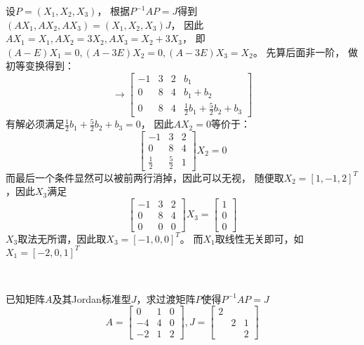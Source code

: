 \begin{solution}
  设$P = (X_1,X_2,X_3)$，
  根据$P^{-1}AP = J$得到$(AX_1,AX_2,AX_3) = (X_1,X_2,X_3)J$，
  因此$AX_1 = X_1, AX_2 = 3X_2, AX_3 = X_2 + 3X_3$，
  即$(A - E)X_1 = 0, (A - 3E)X_2 = 0, (A - 3E)X_3 = X_2$。
  先算后面非一阶，
  做初等变换得到：
  \begin{equation*}
    [A - 3E | b] \rightarrow
    \left[
      \begin{array}{cccc}
        -1&3&2&b_1 \\
          0&8&4&b_1 + b_2 \\
          0&8&4&\frac{1}{2}b_1 + \frac{5}{2}b_2 + b_3
      \end{array}
    \right]
  \end{equation*}
  有解必须满足$\frac{1}{2}b_1 + \frac{5}{2}b_2 + b_3 = 0$，
  因此$AX_2 = 0$等价于：
  \begin{equation*}
    \left[
      \begin{array}{ccc}
        -1&3&2 \\
          0&8&4 \\
          \frac{1}{2}&\frac{5}{2}&1
      \end{array}
    \right]X_2 = 0  
  \end{equation*}
  而最后一个条件显然可以被前两行消掉，因此可以无视，
  随便取$X_2 = [1,-1,2]^T$，因此$X_3$满足
  \begin{equation*}
    \left[
      \begin{array}{ccc}
        -1&3&2 \\
          0&8&4 \\
          0&0&0
      \end{array}
    \right]X_3 = \left[
      \begin{array}{c}
        1 \\
        0\\
        0
      \end{array}
    \right]
  \end{equation*}
  $X_3$取法无所谓，因此取$X_3 = [-1,0,0]^T$。
  而$X_1$取线性无关即可，如$X_1 = [-2,0,1]^T$
\end{solution}


~

\begin{exercise}
  已知矩阵$A$及其Jordan标准型$J$，求过渡矩阵$P$使得$P^{-1}AP = J$
  \begin{equation*}
    A = \left[
      \begin{array}{ccc}
        0&1&0 \\
         -4&4&0 \\
         -2&1&2
      \end{array}
    \right],
    J = \left[
      \begin{array}{ccc}
        2&& \\
         &2&1 \\
         &&2
      \end{array}
    \right]
  \end{equation*}
\end{exercise}

